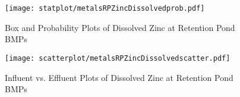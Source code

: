         \begin{figure}[hb]   %
            \centering
            \texttt{[image: statplot/metalsRPZincDissolvedprob.pdf]}
            \caption{Box and Probability Plots of Dissolved Zinc at Retention Pond BMPs}
        \end{figure}         %
        
        
        \begin{figure}[hb]   %
            \centering
            \texttt{[image: scatterplot/metalsRPZincDissolvedscatter.pdf]}
            \caption{Influent vs. Effluent Plots of Dissolved Zinc at Retention Pond BMPs}
        \end{figure}         %
        \clearpage
        